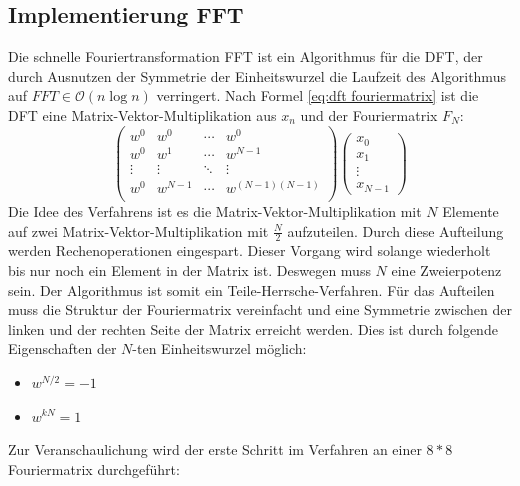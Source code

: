 \subsection{Implementierung FFT}
Die schnelle Fouriertransformation FFT ist ein Algorithmus für die DFT, der durch Ausnutzen der Symmetrie der Einheitswurzel die Laufzeit des Algorithmus auf $FFT \in \mathcal O(n \log n)$ verringert.
\newline
Nach Formel \ref{eq:dft fouriermatrix} ist die DFT eine Matrix-Vektor-Multiplikation aus $x_{n}$ und der Fouriermatrix $F_{N}$:
\begin{equation}
\left( \begin{array}{cccc}
w^0 & w^0 & \cdots & w^0\\
w^0 & w^1 & \cdots & w^{N-1}\\
\vdots & \vdots & \ddots & \vdots\\
w^0 & w^{N-1} & \cdots & w^{(N-1)(N-1)}\\
\end{array}\right)
\left( \begin{array}{c}
x_0\\
x_1\\
\vdots\\
x_{N-1}
\end{array}\right)
\end{equation}
Die Idee des Verfahrens ist es die Matrix-Vektor-Multiplikation mit $N$ Elemente auf zwei Matrix-Vektor-Multiplikation mit $\frac{N}{2}$ aufzuteilen. Durch diese Aufteilung werden Rechenoperationen eingespart. Dieser Vorgang wird solange wiederholt bis nur noch ein Element in der Matrix ist. Deswegen muss $N$ eine Zweierpotenz sein. Der Algorithmus ist somit ein Teile-Herrsche-Verfahren.
Für das Aufteilen muss die Struktur der Fouriermatrix vereinfacht und eine Symmetrie zwischen der linken und der rechten Seite der Matrix erreicht werden. Dies ist durch folgende Eigenschaften der $N$-ten Einheitswurzel möglich:
\begin{itemize}
\item $w^{N/2} = -1$ 
\item $w^{kN} = 1$
\end{itemize}
Zur Veranschaulichung wird der erste Schritt im Verfahren an einer $8*8$ Fouriermatrix durchgeführt:
